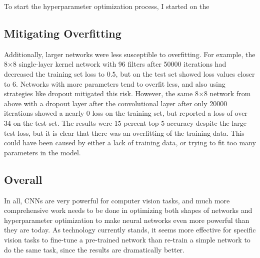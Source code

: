 \documentclass[10pt]{article}
\begin{document}
To start the hyperparameter optimization process, I started on the 


\subsection{Mitigating Overfitting}

Additionally, larger networks were less susceptible to overfitting. For example, the 8$\times$8 single-layer kernel network with 96 filters after 50000 iterations had decreased the training set loss to $0.5$, but on the test set showed loss values closer to $6$. Networks with more parameters tend to overfit less, and also using strategies like dropout mitigated this risk. However, the same 8$\times$8 network from above with a dropout layer after the convolutional layer after only 20000 iterations showed a nearly 0 loss on the training set, but reported a loss of over $34$ on the test set. The results were 15 percent top-5 accuracy despite the large test loss, but it is clear that there was an overfitting of the training data. This could have been caused by either a lack of training data, or trying to fit too many parameters in the model.


\subsection{Overall}

In all, CNNs are very powerful for computer vision tasks, and much more comprehensive work needs to be done in optimizing both shapes of networks and hyperparameter optimization to make neural networks even more powerful than they are today. As technology currently stands, it seems more effective for specific vision tasks to fine-tune a pre-trained network than re-train a simple network to do the same task, since the results are dramatically better.



\end{document}
